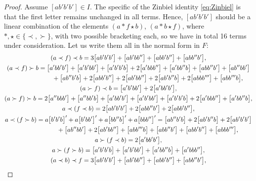 \begin{proof}
Assume $[ab'b'b']\in I$.
The specific of the Zinbiel identity \eqref{eq:Zinbiel}
is that the first letter remains unchanged in all terms.
Hence, $[ab'b'b']$ should be a
linear combination of the elements
$(a\ast f\star b)$, $(a\ast b\star f)$,
where $\ast, \star \in \{\prec, \succ \}$,
with two possible bracketing each, so we have in total 16 terms
under consideration. Let us write them all in the normal form in $F$:
\begin{gather*}
(a\prec f)\prec b
 = 3\bigl[ab'b'b'\bigr]+\bigl[ab'bb''\bigr]+\bigl[abb'b''\bigr]+\bigl[abb''b'\bigr], \\
%
(a\prec f)\succ b
 =\bigl[a'bb'b'\bigr]+\bigl[a'b'bb'\bigr]+\bigl[a'b'b'b\bigr]+2\bigl[a'bbb''\bigr]+\bigl[a'bb''b\bigr]+\bigl[abb''b'\bigr]+\bigl[ab''bb'\bigr]\\
\hphantom{(a\prec f)\succ b=}{} +\bigl[ab''b'b\bigr]+2\bigl[abb'b''\bigr]+2\bigl[ab'bb''\bigr]+2\bigl[ab'b''b\bigr]+2\bigl[abbb'''\bigr]+\bigl[abb'''b\bigr], \\
%
(a\succ f)\prec b
 = \bigl[a'b'bb'\bigr]+2\bigl[a'bb'b'\bigr], \\
%
(a\succ f)\succ b
 = 2\bigl[a''bbb'\bigr]+\bigl[a''bb'b\bigr] +\bigl[a'bb'b'\bigr]+\bigl[a'b'bb'\bigr]+\bigl[a'b'b'b\bigr]+2\bigl[a'bbb''\bigr]+\bigl[a'bb''b\bigr], \\
%
a\prec (f\prec b)
 = 2\bigl[ab'b'b'\bigr]+2\bigl[abb''b'\bigr]+2\bigl[abb'b''\bigr], \\
%
a\prec (f\succ b)
 = a\bigl[b'b'b\bigr]'+a\bigl[b'bb'\bigr]' + a\bigl[bb''b\bigr]' + a\bigl[bbb''\bigr]'
 = \bigl[ab''b'b\bigr] + 2\bigl[ab'b''b\bigr]+ 2\bigl[ab'b'b'\bigr]\\
\hphantom{a\prec (f\succ b)=}{} + \bigl[ab''bb'\bigr]+2\bigl[ab'bb''\bigr] +\bigl[abb'''b\bigr]+\bigl[abb''b'\bigr]+\bigl[abb'b''\bigr]+\bigl[abbb'''\bigr], \\
%
a\succ (f\prec b)
 = 2\bigl[a'bb'b'\bigr], \\
%
a\succ (f\succ b)
 = \bigl[a'b'b'b\bigr]+\bigl[a'b'bb'\bigr]+\bigl[a'bb''b\bigr]+\bigl[a'bbb''\bigr], \\
%
(a\prec b)\prec f
 = 3\bigl[ab'b'b'\bigr] + \bigl[ab'bb''\bigr]+\bigl[abb'b''\bigr]+\bigl[abb''b'\bigr], \\

\end{gather*}
\end{proof}

